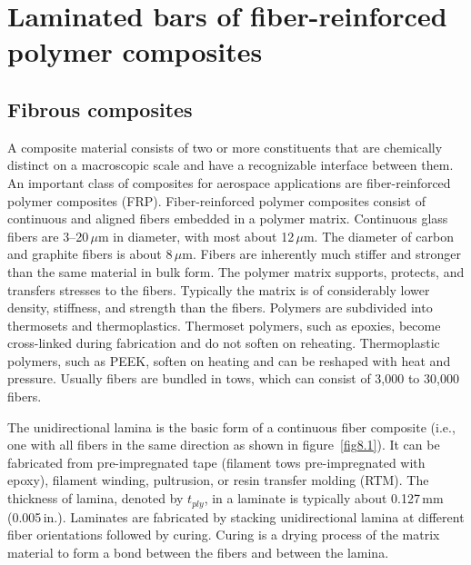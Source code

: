 \documentclass{AeroStructure-ERJohnson}
\begin{document}
\mainmatter

\setcounter{page}{205}

\setcounter{chapter}{7}

\chapter{Laminated bars of fiber-reinforced polymer composites}\label{ch8}

\section{Fibrous composites}\label{sec8.1}

A composite material consists of two or more constituents that are
chemically distinct on a macroscopic scale and have a recognizable
interface between them. An important class of composites for
aerospace applications are fiber-reinforced polymer composites
(FRP). Fiber-reinforced polymer composites consist of continuous
and aligned fibers embedded in a polymer matrix. Continuous glass
fibers are 3--20\,$\mu$m in diameter, with most about 12\,$\mu$m.
The diameter of carbon and graphite fibers is about 8\,$\mu$m.
Fibers are inherently much stiffer and stronger than the same
material in bulk form. The polymer matrix supports, protects, and
transfers stresses to the fibers. Typically the matrix is of
considerably lower density, stiffness, and strength than the
fibers. Polymers are subdivided into thermosets and
thermoplastics. Thermoset polymers, such as epoxies, become
cross-linked during fabrication and do not soften on reheating.
Thermoplastic polymers, such as PEEK, soften on heating and can be
reshaped with heat and pressure. Usually fibers are bundled in
tows, which can consist of 3,000 to 30,000 fibers.

The unidirectional lamina is the basic form of a continuous fiber
composite (i.e., one with all fibers in the same direction as
shown in figure~\ref{fig8.1}). It can be fabricated from
pre-impregnated tape (filament tows pre-impregnated with epoxy),
filament winding, pultrusion, or resin transfer molding (RTM). The
thickness of lamina, denoted by $t_{ply}$, in a laminate is
typically about 0.127\,mm (0.005\,in.). Laminates are fabricated by
stacking unidirectional lamina at different fiber orientations
followed by curing. Curing is a drying process of the matrix
material to form a bond between the fibers and between the lamina.

\end{document}
